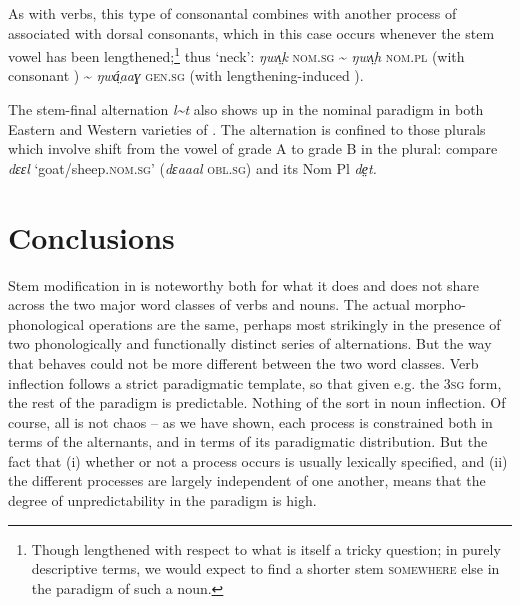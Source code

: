 \documentclass[output=paper
,newtxmath
,modfonts
,nonflat]{langsci/langscibook}
\begin{document}
As with verbs, this type of consonantal  combines with another process of  associated with dorsal consonants, which in this case occurs whenever the stem vowel has been lengthened;\footnote{Though lengthened with respect to what is itself a tricky question; in purely descriptive terms, we would expect to find a shorter stem \textsc{somewhere} else in the paradigm of such a noun.} thus ‘neck’: \textit{ŋwʌ̤}\textit{k} \textsc{nom.sg} {\textasciitilde} \textit{ŋwʌ̤}\textit{h} \textsc{nom.pl} (with consonant ) {\textasciitilde} \textit{ŋwá̤aaɣ} \textsc{gen.sg} (with lengthening-induced ).

The stem-final alternation \textit{l{\textasciitilde}t} also shows up in the nominal paradigm in both Eastern and Western varieties of .  The alternation is confined to those plurals which involve shift from the vowel of grade A to grade B in the plural:  compare \textit{dɛɛl} ‘goat/sheep.\textsc{nom.sg}’ (\textit{dɛaaal} \textsc{obl.sg}) and its Nom Pl \textit{de̤t.} 

\section{Conclusions} %
\label{sec:monich:6}

Stem modification in  is noteworthy both for what it does and does not share across the two major word classes of verbs and nouns. The actual morpho-phonological operations are the same, perhaps most strikingly in the presence of two phonologically and functionally distinct series of  alternations. But the way that  behaves could not be more different between the two word classes. Verb inflection follows a strict paradigmatic template, so that given e.g. the 3\textsc{sg} form, the rest of the paradigm is predictable. Nothing of the sort in noun inflection. Of course, all is not chaos – as we have shown, each  process is constrained both in terms of the alternants, and in terms of its paradigmatic distribution. But the fact that (i) whether or not a  process occurs is usually lexically specified, and (ii) the different  processes are largely independent of one another, means that the degree of unpredictability in the paradigm is high.
\end{document}
